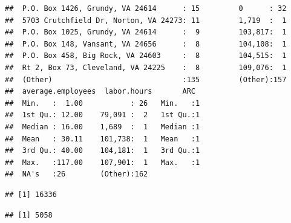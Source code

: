 \documentclass[12pt,]{article}
\newenvironment{Shaded}{\begin{snugshade}}{\end{snugshade}}
\newcommand{\DataTypeTok}[1]{\textcolor[rgb]{0.13,0.29,0.53}{#1}}
\newcommand{\KeywordTok}[1]{\textcolor[rgb]{0.13,0.29,0.53}{\textbf{#1}}}
\newcommand{\NormalTok}[1]{#1}
\newcommand{\OperatorTok}[1]{\textcolor[rgb]{0.81,0.36,0.00}{\textbf{#1}}}
\newcommand{\OtherTok}[1]{\textcolor[rgb]{0.56,0.35,0.01}{#1}}
\begin{document}
\begin{verbatim}
##  P.O. Box 1426, Grundy, VA 24614      : 15         0      : 32     
##  5703 Crutchfield Dr, Norton, VA 24273: 11         1,719  :  1     
##  P.O. Box 1025, Grundy, VA 24614      :  9         103,817:  1     
##  P.O. Box 148, Vansant, VA 24656      :  8         104,108:  1     
##  P.O. Box 458, Big Rock, VA 24603     :  8         104,515:  1     
##  Rt 2, Box 73, Cleveland, VA 24225    :  8         109,076:  1     
##  (Other)                              :135         (Other):157     
##  average.employees  labor.hours       ARC   
##  Min.   :  1.00           : 26   Min.   :1  
##  1st Qu.: 12.00    79,091 :  2   1st Qu.:1  
##  Median : 16.00    1,689  :  1   Median :1  
##  Mean   : 30.11    101,738:  1   Mean   :1  
##  3rd Qu.: 40.00    104,181:  1   3rd Qu.:1  
##  Max.   :117.00    107,901:  1   Max.   :1  
##  NA's   :26        (Other):162
\end{verbatim}

\begin{Shaded}
\end{Shaded}

\begin{verbatim}
## [1] 16336
\end{verbatim}

\begin{Shaded}
\end{Shaded}

\begin{verbatim}
## [1] 5058
\end{verbatim}

\begin{Shaded}
\end{Shaded}
\end{document}
